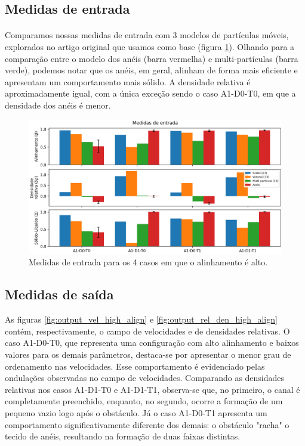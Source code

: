 \documentclass{article}
\theoremstyle{definition}
\def \case#1#2#3{A{#1}-D{#2}-T{#3}}
\begin{document}
\FloatBarrier

\subsection{Medidas de entrada}
\paragraph{}
Comparamos nossas medidas de entrada com 3 modelos de partículas móveis, explorados no artigo original que usamos como base \cite{beatrici_comparing_2023} (figura \ref{fig:input_measurements_high_align}). Olhando para a comparação entre o modelo dos anéis (barra vermelha) e multi-partículas (barra verde), podemos notar que os anéis, em geral, alinham de forma mais eficiente e apresentam um comportamento mais sólido. A densidade relativa é aproximadamente igual, com a única exceção sendo o caso \case{1}{0}{0}, em que a densidade dos anéis é menor. 

\begin{figure}[h]
    \centering
    \includegraphics[width=\linewidth]{figuras/input_measurements/medidas_entrada_high_align_2.png}
    \caption{Medidas de entrada para os 4 casos em que o alinhamento é alto.}
    \label{fig:input_measurements_high_align}
\end{figure}

\subsection{Medidas de saída}
As figuras \ref{fig:output_vel_high_align} e \ref{fig:output_rel_den_high_align} contém, respectivamente, o campo de velocidades e de densidades relativas. O caso \case{1}{0}{0}, que representa uma configuração com alto alinhamento e baixos valores para os demais parâmetros, destaca-se por apresentar o menor grau de ordenamento nas velocidades. Esse comportamento é evidenciado pelas ondulações observadas no campo de velocidades.
Comparando as densidades relativas nos casos \case{1}{1}{0} e \case{1}{1}{1}, observa-se que, no primeiro, o canal é completamente preenchido, enquanto, no segundo, ocorre a formação de um pequeno vazio logo após o obstáculo. Já o caso \case{1}{0}{1} apresenta um comportamento significativamente diferente dos demais: o obstáculo "racha" o tecido de anéis, resultando na formação de duas faixas distintas.
\end{document}
